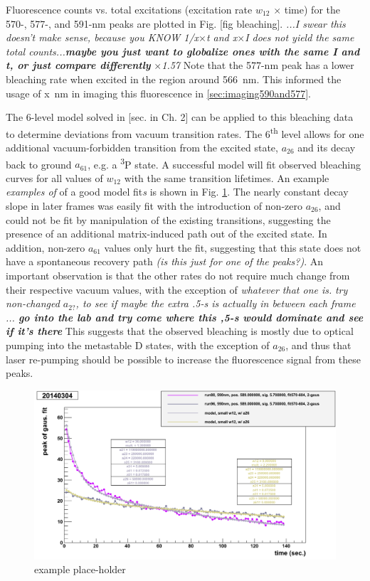 Fluorescence counts vs. total excitations (excitation rate $w_{12}$ $\times$ time) for the 570-, 577-, and 591-nm peaks are plotted in Fig. [fig bleaching].  \emph{\color{gray}...I swear this doesn't make sense, because you KNOW 1/x$\times$t and x$\times$I does not yield the same total counts...\textbf{maybe you just want to globalize ones with the same I and t, or just compare differently}} \emph{\color{red}$\times$1.57}  Note that the 577-nm peak has a lower bleaching rate when excited in the region around {\color{red}566}~nm.  This informed the usage of {\color{red}x}~nm in imaging this fluorescence in \ref{sec:imaging590and577}.


The 6-level model solved in [sec. in Ch. 2] can be applied to this bleaching data to determine deviations from vacuum transition rates.  The 6\textsuperscript{th} level allows for one additional vacuum-forbidden transition from the excited state, $a_{26}$ and its decay back to ground $a_{61}$, e.g. a \textsuperscript{3}P state.  A successful model will fit observed bleaching curves for all values of $w_{12}$ with the same transition lifetimes.  An example \emph{\color{gray}examples of} of a good model fit\emph{\color{gray}s} is shown in Fig. \ref{fig:bleachModel}.   The nearly constant decay slope in later frames was easily fit with the introduction of non-zero $a_{26}$, and could not be fit by manipulation of the existing transitions, suggesting the presence of an additional matrix-induced path out of the excited state. In addition, non-zero $a_{61}$ values only hurt the fit, suggesting that this state does not have a spontaneous recovery path  \emph{\color{gray}(is this just for one of the peaks?)}.  An important observation is that the other rates do not require much change from their respective vacuum values, with the exception of \emph{\color{gray}whatever that one is.}  \emph{try non-changed $a_{2?}$, to see if maybe the extra .5-s is actually in between each frame ... \textbf{go into the lab and try come where this ,5-s would dominate and see if it's there}}  This suggests that the observed bleaching is mostly due to optical pumping into the metastable D states, with the exception of $a_{26}$, and thus that laser re-pumping should be possible to increase the fluorescence signal from these peaks.

\begin{figure} %
        \centering
                \includegraphics[width=.7\textwidth]{figures/model_smallw12_a26_run96and88_close.png}
                \caption{\color{red}example place-holder}
\label{fig:bleachModel}
\end{figure}

